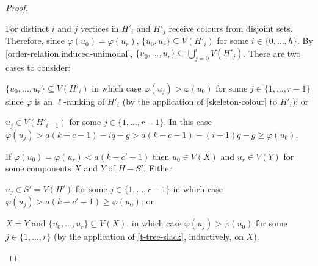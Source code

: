 \documentclass[kpfonts]{patmorin}
\theoremstyle{named}
\begin{document}
\begin{proof}
\begin{compactenum}
        For distinct $i$ and $j$ vertices in $H'_i$ and $H'_j$ receive colours from disjoint sets.  Therefore, since $\varphi(u_0)=\varphi(u_r)$,  $\{u_0,u_r\}\subseteq V(H'_i)$ for some $i\in\{0,\ldots,h\}$.  By \cref{order-relation,induced-unimodal}, $\{u_0,\ldots,u_{r}\}\subseteq \bigcup_{j=0}^{i} V(H'_j)$.  There are two cases to consider:
        \begin{compactenum}
           \item $\{u_0,\ldots,u_{r}\}\subseteq V(H'_i)$ in which case $\varphi(u_j)>\varphi(u_0)$ for some $j\in\{1,\ldots,r-1\}$ since $\varphi$ is an $\ell$-ranking of $H'_i$ (by the application of \cref{skeleton-colour} to $H'_i$); or
           \item $u_j\in V(H'_{i-1})$ for some $j\in\{1,\ldots,r-1\}$.  In this case $\varphi(u_j)>a(k-c-1)-iq-g > a(k-c-1)-(i+1)q-g \ge \varphi(u_0)$.
       \end{compactenum}
       \item If $\varphi(u_0)=\varphi(u_r) < a(k-c'-1)$ then $u_0\in V(X)$ and $u_r\in V(Y)$ for some components $X$ and $Y$ of $H-S'$.  Either
       \begin{compactenum}
            \item $u_j\in S'=V(H')$ for some $j\in\{1,\ldots,r-1\}$ in which case $\varphi(u_j)>a(k-c'-1)\ge\varphi(u_0)$; or
            \item $X=Y$ and $\{u_0,\ldots,u_r\}\subseteq V(X)$, in which case $\varphi(u_j)>\varphi(u_0)$ for some $j\in\{1,\ldots,r\}$ (by the application of \cref{t-tree-slack}, inductively, on $X$). \qedhere
        \end{compactenum}
    \end{compactenum}
\end{proof}
\end{document}
